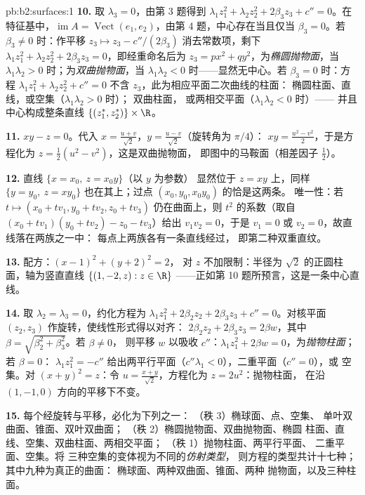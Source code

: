\begin{solution}{pb:b2:surfaces:1}
\textbf{10.} 取 $\lambda_3 = 0$，由第 3 题得到
$\lambda_1z_1^2 + \lambda_2z_2^2 + 2\beta_3z_3 + c'' = 0$。在
特征基中，$\operatorname{im}A = \operatorname{Vect}(e_1,
e_2)$，由第 4 题，中心存在当且仅当 $\beta_3 = 0$。若
$\beta_3 \neq 0$ 时：作平移 $z_3 \mapsto z_3 -
c''/(2\beta_3)$ 消去常数项，剩下 $\lambda_1z_1^2
+ \lambda_2z_2^2 + 2\beta_3z_3 = 0$，即经重命名后为 $z_3 = px^2 +
qy^2$，为\emph{椭圆抛物面}，当
$\lambda_1\lambda_2 > 0$ 时；为\emph{双曲抛物面}，当
$\lambda_1\lambda_2 < 0$ 时——显然无中心。若
$\beta_3 = 0$ 时：方程 $\lambda_1z_1^2 + \lambda_2z_2^2 +
c'' = 0$ 不含 $z_3$，此为相应平面二次曲线的柱面：
椭圆柱面、直线，或空集（$\lambda_1\lambda_2 > 0$ 时）；
双曲柱面，
或两相交平面（$\lambda_1\lambda_2 < 0$ 时）——
并且中心构成整条直线
$\{(z_1^*, z_2^*)\} \times \R$。

\textbf{11.} $xy - z = 0$。代入 $x = \frac{u +
v}{\sqrt2}$，$y = \frac{u - v}{\sqrt2}$（旋转角为 $\pi/4$）：
$xy = \frac{u^2 - v^2}2$，于是方程化为 $z =
\frac12(u^2 - v^2)$，这是双曲抛物面，
即图中的马鞍面（相差因子 $\frac12$）。

\textbf{12.} 直线 $\{x = x_0,\ z = x_0y\}$（以 $y$ 为参数）
显然位于 $z = xy$ 上，同样 $\{y = y_0,\ z =
xy_0\}$ 也在其上；过点 $(x_0, y_0, x_0y_0)$ 的恰是这两条。
唯一性：若 $t \mapsto (x_0 + tv_1, y_0 + tv_2, z_0 +
tv_3)$ 仍在曲面上，则 $t^2$ 的系数（取自 $(x_0
+ tv_1)(y_0 + tv_2) - z_0 - tv_3$）给出 $v_1v_2 = 0$，于是
$v_1 = 0$ 或 $v_2 = 0$，故直线落在两族之一中：
每点上两族各有一条直线经过，
即第二种双重直纹。

\textbf{13.} 配方：$(x - 1)^2 + (y + 2)^2 = 2$，
对 $z$ 不加限制：半径为
$\sqrt2$ 的正圆柱面，轴为竖直直线 $\{(1, -2, z) : z \in
\R\}$ ——正如第 10 题所预言，这是一条中心直线。

\textbf{14.} 取 $\lambda_2 = \lambda_3 = 0$，约化方程为
$\lambda_1z_1^2 + 2\beta_2z_2 + 2\beta_3z_3 + c''
= 0$。对核平面 $(z_2, z_3)$ 作旋转，使线性形式得以对齐：
$2\beta_2z_2 + 2\beta_3z_3 = 2\beta w$，其中
$\beta = \sqrt{\beta_2^2 + \beta_3^2}$。若 $\beta \neq 0$，
则平移 $w$ 以吸收 $c''$：$\lambda_1z_1^2 + 2\beta w =
0$，为\emph{抛物柱面}；若 $\beta = 0$：
$\lambda_1z_1^2 = -c''$ 给出两平行平面（$c''
\lambda_1 < 0$），二重平面（$c'' = 0$），或
空集。对 $(x + y)^2 = z$：令 $u = \frac{x + y}{\sqrt2}$，方程化为
$z = 2u^2$：抛物柱面，
在沿 $(1, -1, 0)$ 方向的平移下不变。

\textbf{15.} 每个经旋转与平移，必化为下列之一：
（秩 3）椭球面、点、空集、
单叶双曲面、锥面、双叶双曲面；
（秩 2）椭圆抛物面、双曲抛物面、椭圆
柱面、直线、空集、双曲柱面、两相交平面；
（秩 1）抛物柱面、两平行平面、
二重平面、空集。将
三种空集的变体视为不同的\emph{仿射类型}，
则方程的类型共计十七种；其中九种为真正的曲面：
椭球面、两种双曲面、锥面、两种
抛物面，以及三种柱面。


\end{solution}
